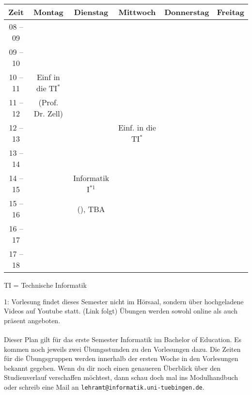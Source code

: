 \begin{minipage}{\textwidth}
    \footnotesize
\begin{center}
	\begin{tabular}{|c|c|c|c|c|c|}
	\hline
	 Zeit     &    Montag                    & Dienstag          & Mittwoch          & Donnerstag & Freitag \\ \hline\hline
	 08 -- 09 &                              &                   &                   &  &  \\ \cline{1-1} \cline{3-3} \cline{5-6} 
	 09 -- 10 &                              &                   &                   &  &  \\ \hline
	 10 -- 11 &    Einf in die TI$^*$            &                   &                   &  &  \\ \cline{1-1} \cline{3-6} 
	 11 -- 12 &    (Prof. Dr. Zell)          &                   &                   &  &  \\ \hline
	 12 -- 13 &                              &                   & Einf. in die TI$^*$   &  &  \\ \hline
	 13 -- 14 &                              &                   &                   &  &  \\ \hline
	 14 -- 15 &                              & Informatik I$^{*1}$      &                   &  &  \\ \cline{1-2} \cline{4-6} 
	 15 -- 16 &                              & (\Infoprof), TBA  &                   &  &  \\ \hline
	 16 -- 17 &                              &                   &                   &  &  \\ \hline
	 17 -- 18 &                              &                   &                   &  &  \\ \hline
	\end{tabular}
	
	\scriptsize TI = Technische Informatik
	
\end{center}
\end{minipage}
1: Vorlesung findet dieses Semester nicht im Hörsaal, sondern über hochgeladene Videos auf Youtube statt. (Link folgt) Übungen werden sowohl online als auch präsent angeboten.\\
\\
Dieser Plan gilt für das erste Semester Informatik im Bachelor of Education. Es kommen noch jeweils zwei Übungsstunden zu den Vorlesungen dazu.
Die Zeiten für die Übungsgruppen werden innerhalb der ersten Woche in den Vorlesungen bekannt gegeben. Wenn du dir noch einen genaueren Überblick über den Studienverlauf verschaffen möchtest, dann schau doch mal ins Modulhandbuch oder schreib eine Mail an \texttt{lehramt@informatik.uni-tuebingen.de}.

